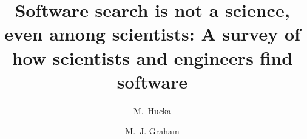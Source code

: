 \documentclass[review]{elsarticle}
\begin{document}
\begin{frontmatter}

\title{Software search is not a science, even among scientists: A survey of how scientists and engineers find software}

\author[cms]{M.~Hucka}
\author[astro]{M.~J. Graham}

\address[cms]{Department of Computing and Mathematical Sciences, Mail Code 306-15, California Institute of Technology, Pasadena, California 91125, USA}

\address[astro]{Department of Astronomy, Mail Code 158-79, California Institute of Technology, Pasadena, California 91125, USA}


\end{frontmatter}
\end{document}
